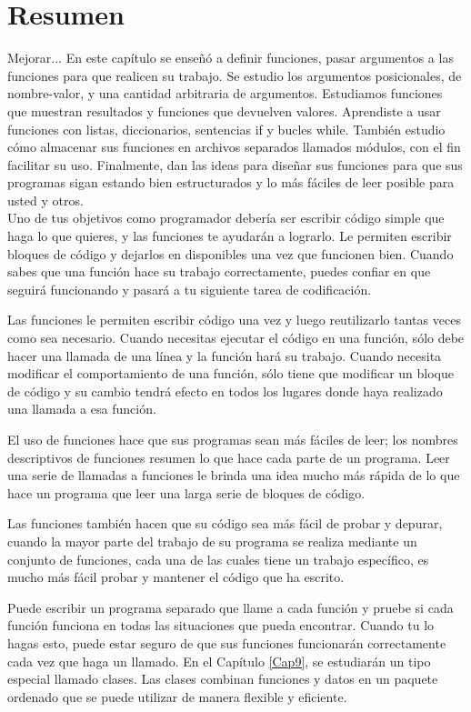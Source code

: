 \section{Resumen}
Mejorar...
En este capítulo se enseñó a definir funciones,  pasar argumentos a las funciones para que realicen su trabajo. Se estudio los argumentos posicionales, de nombre-valor, y una cantidad arbitraria de argumentos.  Estudiamos funciones que muestran resultados y funciones que devuelven valores. Aprendiste a usar funciones con listas, diccionarios, sentencias {\ttfamily if} y bucles {\ttfamily while}. 
También estudio cómo almacenar sus funciones en archivos separados llamados módulos, con el fin facilitar su uso. Finalmente, dan las ideas para  diseñar sus funciones para que sus programas sigan estando bien estructurados y lo más fáciles de leer posible para usted y otros.\\

Uno de tus objetivos como programador debería ser escribir código simple que haga lo que quieres, y las funciones te ayudarán a lograrlo. Le permiten escribir bloques de código y dejarlos en disponibles una vez que funcionen bien. Cuando sabes que una función hace su trabajo correctamente, puedes confiar en que seguirá funcionando y pasará a tu siguiente tarea de codificación.

Las funciones le permiten escribir código una vez y luego reutilizarlo tantas veces como sea necesario. Cuando necesitas ejecutar el código en una función, sólo debe hacer  una llamada de una línea y la función hará su trabajo. Cuando necesita modificar el comportamiento de una función, sólo tiene que modificar un bloque de código y su cambio tendrá efecto en todos los lugares donde haya realizado una llamada a esa función.

El uso de funciones hace que sus programas sean más fáciles de leer; los  nombres  descriptivos de funciones resumen lo que hace cada parte de un programa. Leer una serie de llamadas a funciones le brinda una idea mucho más rápida de lo que hace un programa que leer una larga serie de bloques de código.

Las funciones también hacen que su código sea más fácil de probar y depurar, cuando la mayor parte
del trabajo de su programa se realiza mediante un conjunto de funciones, cada una de las cuales tiene un
trabajo específico, es mucho más fácil probar y mantener el código que ha escrito.

Puede escribir un programa separado que llame a cada función y pruebe si cada función funciona en todas las situaciones que pueda encontrar. Cuando tu lo hagas esto, puede estar seguro de que sus funciones funcionarán correctamente cada vez que haga un llamado.  En el Capítulo \ref{Cap9}, se estudiarán un tipo especial llamado clases. Las clases combinan funciones y
datos en un paquete ordenado que se puede utilizar de manera flexible y eficiente.\\



